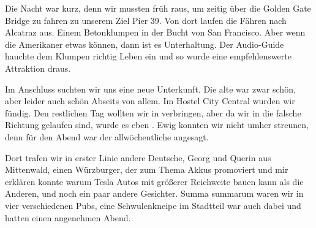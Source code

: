 Die Nacht war kurz, denn wir mussten früh raus, um zeitig über die Golden Gate Bridge zu fahren zu unserem Ziel Pier 39.
Von dort laufen die Fähren nach Alcatraz aus.
Einem Betonklumpen in der Bucht von San Francisco.
Aber wenn die Amerikaner etwas können, dann ist es Unterhaltung.
Der Audio-Guide hauchte dem Klumpen richtig Leben ein und so wurde eine empfehlenswerte Attraktion draus.

\newpage
\thispagestyle{empty}
\newpage

Im Anschluss suchten wir uns eine neue Unterkunft.
Die alte war zwar schön, aber leider auch schön Abseits von allem.
Im Hostel City Central wurden wir fündig.
Den restlichen Tag wollten wir in  verbringen, aber da wir in die falsche Richtung gelaufen sind, wurde es eben .
Ewig konnten wir nicht umher streunen, denn für den Abend war der allwöchentliche  angesagt.

Dort trafen wir in erster Linie andere Deutsche, Georg und Querin aus Mittenwald, einen Würzburger, der zum Thema Akkus promoviert und mir erklären konnte warum Tesla Autos mit größerer Reichweite bauen kann als die Anderen, und noch ein paar andere Gesichter.
Summa summarum waren wir in vier verschiedenen Pubs, eine Schwulenkneipe im Stadtteil  war auch dabei und hatten einen angenehmen Abend.

%

